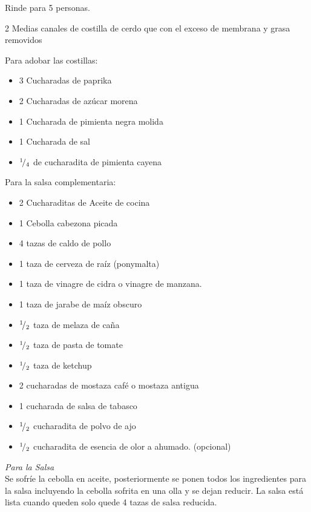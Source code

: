 
Rinde para 5 personas.


\begin{ingredientes}
\item 2 Medias canales de costilla de cerdo que con el exceso de membrana y grasa removidos
\item Para adobar las costillas:
\begin{itemize}
\item 3 Cucharadas de paprika
\item 2 Cucharadas de azúcar morena
\item 1 Cucharada de pimienta negra molida
\item 1 Cucharada de sal
\item ${}^{1}\!/_{4}$ de cucharadita de pimienta cayena
\end{itemize}
\item Para la salsa complementaria:
\begin{itemize}
\item 2 Cucharaditas de Aceite de cocina
\item 1 Cebolla cabezona picada
\item 4 tazas de caldo de pollo
\item 1 taza de cerveza de raíz (ponymalta)
\item 1 taza de vinagre de cidra o vinagre de manzana.
\item 1 taza de jarabe de maíz obscuro
\item ${}^{1}\!/_{2}$ taza de melaza de caña
\item ${}^{1}\!/_{2}$ taza de pasta de tomate
\item ${}^{1}\!/_{2}$ taza de ketchup
\item 2 cucharadas de mostaza café o mostaza antigua
\item 1 cucharada de salsa de tabasco
\item ${}^{1}\!/_{2}$ cucharadita de polvo de ajo
\item ${}^{1}\!/_{2}$ cucharadita de esencia de olor a ahumado. (opcional)
\end{itemize}
\end{ingredientes}
\preparacion

\emph{Para la Salsa}\\

Se sofríe la cebolla en aceite, posteriormente se ponen todos los ingredientes para la salsa incluyendo la cebolla sofrita en una olla y se dejan reducir. La salsa está lista cuando queden solo quede 4 tazas de salsa reducida.\\

